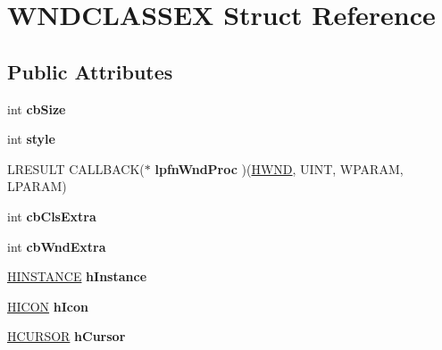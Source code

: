 \hypertarget{structWNDCLASSEX}{\section{W\-N\-D\-C\-L\-A\-S\-S\-E\-X Struct Reference}
\label{structWNDCLASSEX}
}
\subsection*{Public Attributes}
\begin{DoxyCompactItemize}
\item 
\hypertarget{structWNDCLASSEX_a18d513a48dedb360d3b9b174e24b3969}{int {\bfseries cb\-Size}}\label{structWNDCLASSEX_a18d513a48dedb360d3b9b174e24b3969}

\item 
\hypertarget{structWNDCLASSEX_a018179f44177a07a71ecc69f7d8e26fd}{int {\bfseries style}}\label{structWNDCLASSEX_a018179f44177a07a71ecc69f7d8e26fd}

\item 
\hypertarget{structWNDCLASSEX_a612789839279ffedbdb3d101618762d7}{L\-R\-E\-S\-U\-L\-T C\-A\-L\-L\-B\-A\-C\-K($\ast$ {\bfseries lpfn\-Wnd\-Proc} )(\hyperlink{struct__HWND}{H\-W\-N\-D}, U\-I\-N\-T, W\-P\-A\-R\-A\-M, L\-P\-A\-R\-A\-M)}\label{structWNDCLASSEX_a612789839279ffedbdb3d101618762d7}

\item 
\hypertarget{structWNDCLASSEX_a3bcc0d8bf4e1aa0eab263090cd269217}{int {\bfseries cb\-Cls\-Extra}}\label{structWNDCLASSEX_a3bcc0d8bf4e1aa0eab263090cd269217}

\item 
\hypertarget{structWNDCLASSEX_a23ba5cd66afdfc5870b7f1cd92e05b30}{int {\bfseries cb\-Wnd\-Extra}}\label{structWNDCLASSEX_a23ba5cd66afdfc5870b7f1cd92e05b30}

\item 
\hypertarget{structWNDCLASSEX_a61fb96cd388756bc771d6f22532dbee6}{\hyperlink{struct__HINSTANCE}{H\-I\-N\-S\-T\-A\-N\-C\-E} {\bfseries h\-Instance}}\label{structWNDCLASSEX_a61fb96cd388756bc771d6f22532dbee6}

\item 
\hypertarget{structWNDCLASSEX_a18167e67b4272dfbc4aed312c4f12f53}{\hyperlink{struct__HICON}{H\-I\-C\-O\-N} {\bfseries h\-Icon}}\label{structWNDCLASSEX_a18167e67b4272dfbc4aed312c4f12f53}

\item 
\hypertarget{structWNDCLASSEX_a34db6315cb7e594c926769f222e91af5}{\hyperlink{struct__HCURSOR}{H\-C\-U\-R\-S\-O\-R} {\bfseries h\-Cursor}}\label{structWNDCLASSEX_a34db6315cb7e594c926769f222e91af5}


\end{DoxyCompactItemize}
